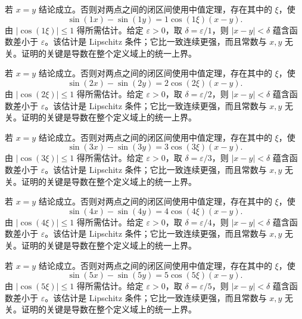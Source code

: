 \documentclass[UTF8,12pt,a4paper,fontset=fandol]{ctexart}
\begin{document}
\begin{solve}\label{ans:c10q8}
若 $x=y$ 结论成立。否则对两点之间的闭区间使用中值定理，存在其中的 $\xi$，使
\[
\sin(1x)-\sin(1y)=1\cos(1\xi)(x-y).
\]
由 $|\cos(1\xi)|\le1$ 得所需估计。给定 $\varepsilon>0$，取 $\delta=\varepsilon/1$，则 $|x-y|<\delta$ 蕴含函数差小于 $\varepsilon$。该估计是 Lipschitz 条件；它比一致连续更强，而且常数与 $x,y$ 无关。证明的关键是导数在整个定义域上的统一上界。
\end{solve}

\begin{solve}\label{ans:c10q9}
若 $x=y$ 结论成立。否则对两点之间的闭区间使用中值定理，存在其中的 $\xi$，使
\[
\sin(2x)-\sin(2y)=2\cos(2\xi)(x-y).
\]
由 $|\cos(2\xi)|\le1$ 得所需估计。给定 $\varepsilon>0$，取 $\delta=\varepsilon/2$，则 $|x-y|<\delta$ 蕴含函数差小于 $\varepsilon$。该估计是 Lipschitz 条件；它比一致连续更强，而且常数与 $x,y$ 无关。证明的关键是导数在整个定义域上的统一上界。
\end{solve}

\begin{solve}\label{ans:c10q10}
若 $x=y$ 结论成立。否则对两点之间的闭区间使用中值定理，存在其中的 $\xi$，使
\[
\sin(3x)-\sin(3y)=3\cos(3\xi)(x-y).
\]
由 $|\cos(3\xi)|\le1$ 得所需估计。给定 $\varepsilon>0$，取 $\delta=\varepsilon/3$，则 $|x-y|<\delta$ 蕴含函数差小于 $\varepsilon$。该估计是 Lipschitz 条件；它比一致连续更强，而且常数与 $x,y$ 无关。证明的关键是导数在整个定义域上的统一上界。
\end{solve}

\begin{solve}\label{ans:c10q11}
若 $x=y$ 结论成立。否则对两点之间的闭区间使用中值定理，存在其中的 $\xi$，使
\[
\sin(4x)-\sin(4y)=4\cos(4\xi)(x-y).
\]
由 $|\cos(4\xi)|\le1$ 得所需估计。给定 $\varepsilon>0$，取 $\delta=\varepsilon/4$，则 $|x-y|<\delta$ 蕴含函数差小于 $\varepsilon$。该估计是 Lipschitz 条件；它比一致连续更强，而且常数与 $x,y$ 无关。证明的关键是导数在整个定义域上的统一上界。
\end{solve}

\begin{solve}\label{ans:c10q12}
若 $x=y$ 结论成立。否则对两点之间的闭区间使用中值定理，存在其中的 $\xi$，使
\[
\sin(5x)-\sin(5y)=5\cos(5\xi)(x-y).
\]
由 $|\cos(5\xi)|\le1$ 得所需估计。给定 $\varepsilon>0$，取 $\delta=\varepsilon/5$，则 $|x-y|<\delta$ 蕴含函数差小于 $\varepsilon$。该估计是 Lipschitz 条件；它比一致连续更强，而且常数与 $x,y$ 无关。证明的关键是导数在整个定义域上的统一上界。
\end{solve}
\end{document}
